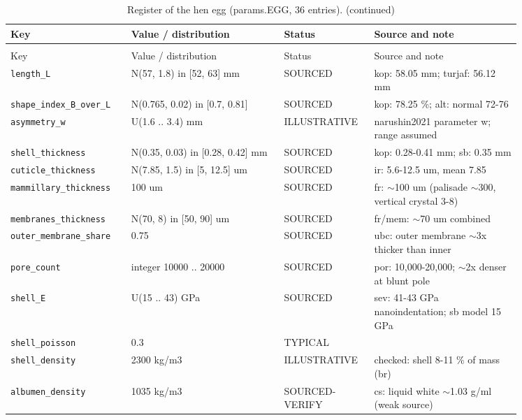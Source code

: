 \documentclass[10.5pt,a4paper]{article}
\begin{document}
{\scriptsize\begin{longtable}{@{}p{0.2\linewidth}p{0.27\linewidth}p{0.12\linewidth}p{0.26\linewidth}@{}}\caption{Register of the hen egg (params.EGG, 36 entries).}\\\toprule Key & Value / distribution & Status & Source and note \\\midrule\endfirsthead
\caption[]{Register of the hen egg (params.EGG, 36 entries). (continued)}\\\toprule Key & Value / distribution & Status & Source and note \\\midrule\endhead
\texttt{length\_\allowbreak{}L} & N(57, 1.8) in [52, 63] mm & SOURCED & kop: 58.05 mm; turjaf: 56.12 mm \\
\texttt{shape\_\allowbreak{}index\_\allowbreak{}B\_\allowbreak{}over\_\allowbreak{}L} & N(0.765, 0.02) in [0.7, 0.81] & SOURCED & kop: 78.25 \%; alt: normal 72-76 \\
\texttt{asymmetry\_\allowbreak{}w} & U(1.6 .. 3.4) mm & ILLUSTRATIVE & narushin2021 parameter w; range assumed \\
\texttt{shell\_\allowbreak{}thickness} & N(0.35, 0.03) in [0.28, 0.42] mm & SOURCED & kop: 0.28-0.41 mm; sb: 0.35 mm \\
\texttt{cuticle\_\allowbreak{}thickness} & N(7.85, 1.5) in [5, 12.5] um & SOURCED & ir: 5.6-12.5 um, mean 7.85 \\
\texttt{mammillary\_\allowbreak{}thickness} & 100 um & SOURCED & fr: $\sim$100 um (palisade $\sim$300, vertical crystal 3-8) \\
\texttt{membranes\_\allowbreak{}thickness} & N(70, 8) in [50, 90] um & SOURCED & fr/mem: $\sim$70 um combined \\
\texttt{outer\_\allowbreak{}membrane\_\allowbreak{}share} & 0.75 & SOURCED & ubc: outer membrane $\sim$3x thicker than inner \\
\texttt{pore\_\allowbreak{}count} & integer 10000 .. 20000 & SOURCED & por: 10,000-20,000; $\sim$2x denser at blunt pole \\
\texttt{shell\_\allowbreak{}E} & U(15 .. 43) GPa & SOURCED & sev: 41-43 GPa nanoindentation; sb model 15 GPa \\
\texttt{shell\_\allowbreak{}poisson} & 0.3 & TYPICAL &  \\
\texttt{shell\_\allowbreak{}density} & 2300 kg/m3 & ILLUSTRATIVE & checked: shell 8-11 \% of mass (br) \\
\texttt{albumen\_\allowbreak{}density} & 1035 kg/m3 & SOURCED-VERIFY & cs: liquid white $\sim$1.03 g/ml (weak source) \\

\end{longtable}}
\end{document}
